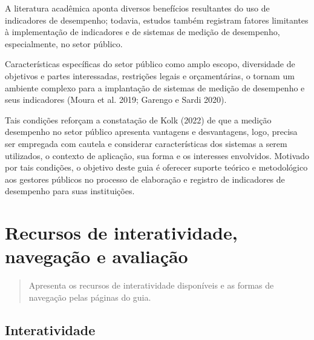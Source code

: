 \documentclass[
  letterpaper,
  DIV=11,
  numbers=noendperiod]{scrreprt}
\begin{document}
A literatura acadêmica aponta diversos benefícios resultantes do uso de
indicadores de desempenho; todavia, estudos também registram fatores
limitantes à implementação de indicadores e de sistemas de medição de
desempenho, especialmente, no setor público.

\begin{tcolorbox}[enhanced jigsaw, title=\textcolor{quarto-callout-warning-color}{\faExclamationTriangle}\hspace{0.5em}{Importante}, bottomrule=.15mm, arc=.35mm, bottomtitle=1mm, toprule=.15mm, coltitle=black, opacityback=0, colback=white, rightrule=.15mm, breakable, toptitle=1mm, leftrule=.75mm, titlerule=0mm, opacitybacktitle=0.6, colbacktitle=quarto-callout-warning-color!10!white, left=2mm, colframe=quarto-callout-warning-color-frame]

Características específicas do setor público como amplo escopo,
diversidade de objetivos e partes interessadas, restrições legais e
orçamentárias, o tornam um ambiente complexo para a implantação de
sistemas de medição de desempenho e seus indicadores (Moura et al. 2019;
Garengo e Sardi 2020).

\end{tcolorbox}

Tais condições reforçam a constatação de Kolk (2022) de que a medição
desempenho no setor público apresenta vantagens e desvantagens, logo,
precisa ser empregada com cautela e considerar características dos
sistemas a serem utilizados, o contexto de aplicação, sua forma e os
interesses envolvidos. Motivado por tais condições, o objetivo deste
guia é oferecer suporte teórico e metodológico aos gestores públicos no
processo de elaboração e registro de indicadores de desempenho para suas
instituições.

\hypertarget{recursos-de-interatividade-navegauxe7uxe3o-e-avaliauxe7uxe3o}{%
\chapter{Recursos de interatividade, navegação e
avaliação}\label{recursos-de-interatividade-navegauxe7uxe3o-e-avaliauxe7uxe3o}}

\begin{quote}
Apresenta os recursos de interatividade disponíveis e as formas de
navegação pelas páginas do guia.
\end{quote}

\hypertarget{interatividade}{%
\section{Interatividade}\label{interatividade}}
\end{document}
